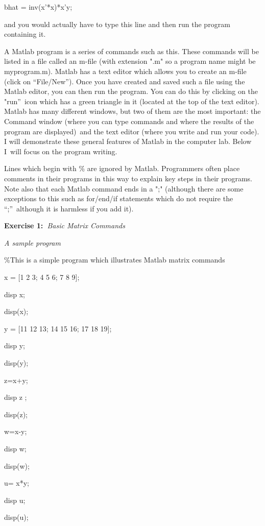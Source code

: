 \documentclass{article}
\begin{document}
bhat = inv(x'*x)*x'y;

and you would actually have to type this line and then run the program
containing it.

A Matlab program is a series of commands such as this. These commands will
be listed in a file called an m-file (with extension ".m" so a program name
might be myprogram.m). Matlab has a text editor which allows you to create
an m-file (click on \textquotedblleft File/New\textquotedblright ). Once you
have created and saved such a file using the Matlab editor, you can then run
the program. You can do this by clicking on the "run\textquotedblright\ icon
which has a green triangle in it (located at the top of the text editor).
Matlab has many different windows, but two of them are the most important:
the Command window (where you can type commands and where the results of the
program are displayed)\ and the text editor (where you write and run your
code). I will demonstrate these general features of Matlab in the computer
lab. Below I\ will focus on the program writing.

Lines which begin with \% are ignored by Matlab. Programmers often place
comments in their programs in this way to explain key steps in their
programs. Note also that each Matlab command ends in a ";" (although there
are some exceptions to this such as for/end/if statements which do not
require the \textquotedblleft ;\textquotedblright\ although it is harmless
if you add it).

\bigskip

\textbf{Exercise 1:\ }\textit{Basic Matrix Commands}

\textit{A sample program}

\%This is a simple program which illustrates Matlab matrix commands

x = [1 2 3; 4 5 6; 7 8 9];

disp x;

disp(x);

y = [11 12 13; 14 15 16; 17 18 19];

disp y;

disp(y);

z=x+y;

disp z ;

disp(z);

w=x-y;

disp w;

disp(w);

u= x*y;

disp u;

disp(u);
\end{document}
